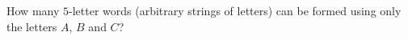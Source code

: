 How many $5$-letter words (arbitrary strings of letters) can be formed using only the letters $A$, $B$ and $C$?

